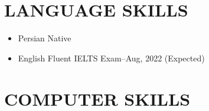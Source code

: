 \documentclass[10pt,a4paper,sans]{moderncv} %
\begin{document}
	\vspace{-1em}
	
	\section{LANGUAGE SKILLS}
	\begin{itemize}[nosep]
	    \item Persian \hspace{5 pt} Native
        \item English \hspace{5 pt} Fluent \hfill IELTS Exam\hspace{5 pt}--\hspace{5 pt}Aug, 2022 (Expected)
        
%		    
%		    
%		    
	\end{itemize}
	
	\vspace{-1em}

	\section{COMPUTER SKILLS}
	
\end{document}
